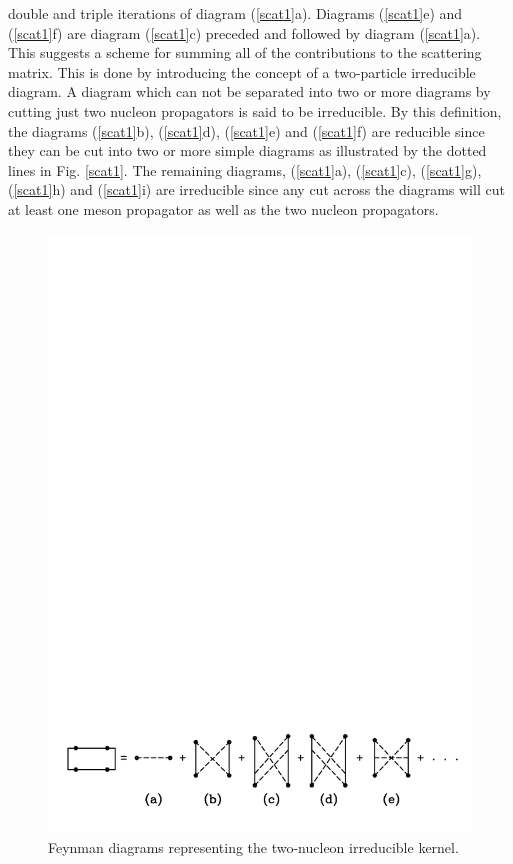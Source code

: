 \documentclass[mythesis.tex]{subfiles}
\begin{document}
double and triple
iterations of diagram (\ref{scat1}a). Diagrams (\ref{scat1}e) and
(\ref{scat1}f) are diagram (\ref{scat1}c) preceded
and followed by diagram (\ref{scat1}a). This suggests a scheme for summing
all of the
contributions to the scattering matrix. This is done by introducing the
concept of a two-particle irreducible diagram. A diagram which can not be
separated into two or more diagrams by cutting just two nucleon propagators
is said to be irreducible. By this definition, the diagrams (\ref{scat1}b),
(\ref{scat1}d), (\ref{scat1}e)
and (\ref{scat1}f) are reducible since they can be cut into two or more
simple diagrams
as illustrated by the dotted lines in Fig. \ref{scat1}.
The remaining diagrams, (\ref{scat1}a), (\ref{scat1}c),
(\ref{scat1}g), (\ref{scat1}h) and (\ref{scat1}i) are irreducible since
any cut across the diagrams will
cut at least one meson propagator as well as the two nucleon propagators.

\begin{figure}
\centerline{\includegraphics[width=5.5in]{graphics/new/kernel.pdf}}
\caption{Feynman diagrams representing the two-nucleon irreducible
kernel.} \label{reduce}
\end{figure}
\end{document}
